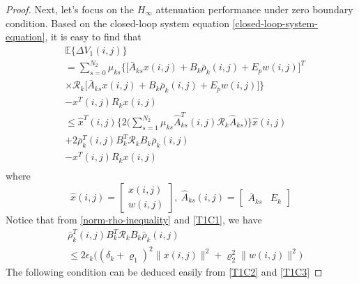 \documentclass[conference]{IEEEtran}
\begin{document}
\begin{proof}
	Next, let's focus on the $H_{\infty}$ attenuation performance under zero boundary condition. Based on the closed-loop system equation \eqref{closed-loop-system-equation}, it is easy to find that
	\begin{equation}\label{DETAV1}
	\begin{split}
	&\mathbb{E}\{\varDelta V_{1}(i,j) \}\\
	&=  \sum_{s=0}^{N_{2}}\mu_{ks}\Big\{\big[\bar{A}_{ks}x(i,j)+B_{k}\bar{\rho}_{k}(i,j)+E_{p}w(i,j)\big]^{T}\\
	&\times \mathcal{R}_{k}\big[\bar{A}_{ks}x(i,j)+B_{k}\bar{\rho}_{k}(i,j)+E_{p}w(i,j)\big]\Big\}\\
	&- x^{T}(i,j)R_{k}x(i,j) \\
	&\leq \hat{x}^{T}(i,j) \Big\{2\big(\sum_{s=1}^{N_{2}}\mu_{ks}\hat{A}^{T}_{ks}(i,j)\mathcal{R}_{k}\hat{A}_{ks}\big)\Big\}\hat{x}(i,j)\\ &+2\bar{\rho}^{T}_{k}(i,j)B^{T}_{k}\mathcal{R}_{k}B_{k}\bar{\rho}_{k}(i,j) \\
	&-  x^{T}(i,j)R_{k}x(i,j)\\
	\end{split}
	\end{equation}
	where
	\begin{equation*}
		\hat{x}(i,j)=\begin{bmatrix}
		x(i,j)\\ w(i,j)
		\end{bmatrix},\ \hat{A}_{ks}(i,j)=\begin{bmatrix}
		\bar{A}_{ks}&E_{k}
		\end{bmatrix}
	\end{equation*}
	Notice that from \eqref{norm-rho-inequality} and \eqref{T1C1}, we have
	\begin{equation}\label{invRho}
		\begin{split}
		 	&\bar{\rho}^{T}_{k}(i,j)B^{T}_{k}\mathcal{R}_{k}B_{k}\bar{\rho}_{k}(i,j)\\
		 	&\leq 2\epsilon_{k}\big((\delta_{k}+\varrho_{1})^{2}\|x(i,j)\|^{2}+\varrho_{2}^{2}\|w(i,j)\|^{2} \big)
		\end{split}
	\end{equation} 
	The following condition can be deduced easily from \eqref{T1C2} and \eqref{T1C3}

\end{proof}
\end{document}
